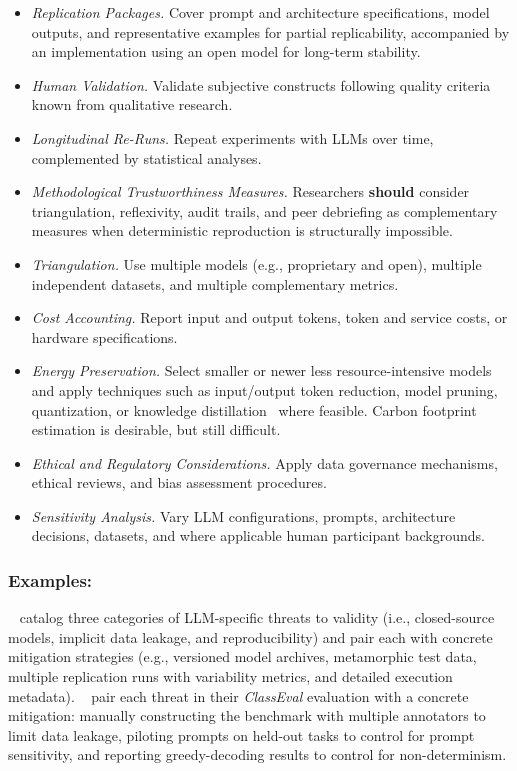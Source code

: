 \documentclass[smallextended]{svjour3}
\newcommand{\should}{\textbf{should}\xspace}
\newcommand{\guidelinesubsubsection}[1]{\subsubsection{\bfseries #1:}}
\newcommand{\guidelinesubsubsection}[1]{\subsubsection{#1}}
\begin{document}
\begin{itemize}
    \item \emph{Replication Packages.} Cover prompt and architecture specifications, model outputs, and representative examples for partial replicability, accompanied by an implementation using an open model for long-term stability.
    \item \emph{Human Validation.} Validate subjective constructs following quality criteria known from qualitative research.
    \item \emph{Longitudinal Re-Runs.} Repeat experiments with LLMs over time, complemented by statistical analyses.
    \item \emph{Methodological Trustworthiness Measures.} Researchers \should consider triangulation, reflexivity, audit trails, and peer debriefing as complementary measures when deterministic reproduction is structurally impossible.
    \item \emph{Triangulation.} Use multiple models (e.g., proprietary and open), multiple independent datasets, and multiple complementary metrics.
    \item \emph{Cost Accounting.} Report input and output tokens, token and service costs, or hardware specifications.
    \item \emph{Energy Preservation.} Select smaller or newer less resource-intensive models and apply techniques such as input/output token reduction, model pruning, quantization, or knowledge distillation~\cite{mitu2024hidden} where feasible. Carbon footprint estimation is desirable, but still difficult.
    \item \emph{Ethical and Regulatory Considerations.} Apply data governance mechanisms, ethical reviews, and bias assessment procedures.
    \item \emph{Sensitivity Analysis.} Vary LLM configurations, prompts, architecture decisions, datasets, and where applicable human participant backgrounds.
\end{itemize}

\guidelinesubsubsection{Examples}

\citeauthor{DBLP:conf/icse/SallouDP24}~\cite{DBLP:conf/icse/SallouDP24} catalog three categories of LLM-specific threats to validity (i.e., closed-source models, implicit data leakage, and reproducibility) and pair each with concrete mitigation strategies (e.g., versioned model archives, metamorphic test data, multiple replication runs with variability metrics, and detailed execution metadata).
\citeauthor{DBLP:conf/icse/Du0WWL0FS0L24}~\cite{DBLP:conf/icse/Du0WWL0FS0L24} pair each threat in their \emph{ClassEval} evaluation with a concrete mitigation: manually constructing the benchmark with multiple annotators to limit data leakage, piloting prompts on held-out tasks to control for prompt sensitivity, and reporting greedy-decoding results to control for non-determinism.
\end{document}
